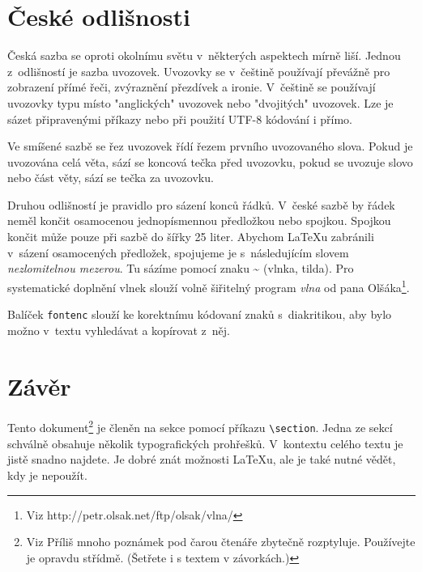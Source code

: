 \documentclass[10pt,a4paper,twocolumn]{article}
\begin{document}
\section{České odlišnosti}

Česká sazba se oproti okolnímu světu v~některých aspektech mírně liší. Jednou z~odlišností je sazba uvozovek. Uvozovky se v~češtině používají převážně pro zobrazení přímé řeči, zvýraznění přezdívek a ironie. V~češtině se používají uvozovky typu  místo "anglických" uvozovek nebo "dvojitých" uvozovek. Lze je sázet připravenými příkazy nebo při použití UTF-8 kódování i přímo.

Ve smíšené sazbě se řez uvozovek řídí řezem prvního uvozovaného slova. Pokud je uvozována celá věta, sází se koncová tečka před uvozovku, pokud se uvozuje slovo nebo část věty, sází se tečka za uvozovku.

Druhou odlišností je pravidlo pro sázení konců řádků. V~české sazbě by řádek neměl končit osamocenou jednopísmennou předložkou nebo spojkou. Spojkou  končit může pouze při sazbě do šířky 25 liter. Abychom {\LaTeX}u zabránili v~sázení osamocených předložek, spojujeme je s~následujícím slovem \textsl{nezlomitelnou mezerou}. Tu sázíme pomocí znaku \~{} (vlnka, tilda). Pro systematické doplnění vlnek slouží volně šiřitelný program \textsl{vlna} od pana Olšáka\footnote{Viz http://petr.olsak.net/ftp/olsak/vlna/}.

Balíček \texttt{fontenc} slouží ke korektnímu kódovaní znaků s~diakritikou, aby bylo možno v~textu vyhledávat a kopírovat z~něj.
\section{Závěr}
Tento dokument\footnote{Viz Příliš mnoho poznámek pod čarou čtenáře zbytečně rozptyluje. Používejte je opravdu střídmě. (Šetřete i s textem v závorkách.)} je členěn na sekce pomocí příkazu \verb|\section|. Jedna ze sekcí schválně obsahuje několik typografických prohřešků. V~kontextu celého textu je jistě snadno najdete. Je dobré znát možnosti {\LaTeX}u, ale je také nutné vědět, kdy je nepoužít.
\end{document}
